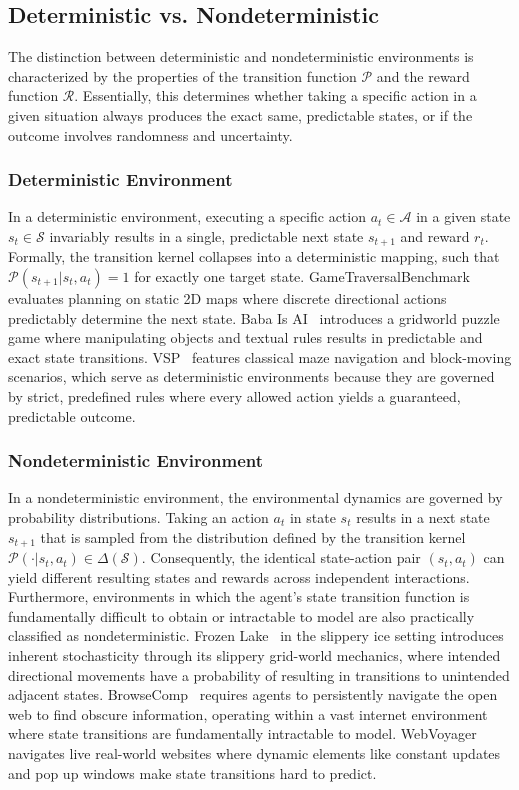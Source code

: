 \subsection{Deterministic vs. Nondeterministic}
\label{attribute:Deterministic vs. Nondeterministic}
The distinction between deterministic and nondeterministic environments is characterized by the properties of the transition function $\mathcal{P}$ and the reward function $\mathcal{R}$. Essentially, this determines whether taking a specific action in a given situation always produces the exact same, predictable states, or if the outcome involves randomness and uncertainty.

\subsubsection{Deterministic Environment}
In a deterministic environment, executing a specific action $a_t \in \mathcal{A}$ in a given state $s_t \in \mathcal{S}$ invariably results in a single, predictable next state $s_{t+1}$ and reward $r_t$. Formally, the transition kernel collapses into a deterministic mapping, such that $\mathcal{P}(s_{t+1} | s_t, a_t) = 1$ for exactly one target state. GameTraversalBenchmark~\cite{GameTraversalBenchmark} evaluates planning on static 2D maps where discrete directional actions predictably determine the next state. Baba Is AI~\cite{BabaIsAI} introduces a gridworld puzzle game where manipulating objects and textual rules results in predictable and exact state transitions. 
VSP~\cite{Vsp} features classical maze navigation and block-moving scenarios, which serve as deterministic environments because they are governed by strict, predefined rules where every allowed action yields a guaranteed, predictable outcome.


\subsubsection{Nondeterministic Environment}
In a nondeterministic environment, the environmental dynamics are governed by probability distributions. Taking an action $a_t$ in state $s_t$ results in a next state $s_{t+1}$ that is sampled from the distribution defined by the transition kernel $\mathcal{P}(\cdot | s_t, a_t) \in \Delta(\mathcal{S})$. Consequently, the identical state-action pair $(s_t, a_t)$ can yield different resulting states and rewards across independent interactions. Furthermore, environments in which the agent's state transition function is fundamentally difficult to obtain or intractable to model are also practically classified as nondeterministic. Frozen Lake~\cite{Openai_gym} in the slippery ice setting introduces inherent stochasticity through its slippery grid-world mechanics, where intended directional movements have a probability of resulting in transitions to unintended adjacent states. BrowseComp~\cite{BrowseComp} requires agents to persistently navigate the open web to find obscure information, operating within a vast internet environment where state transitions are fundamentally intractable to model. WebVoyager~\cite{WebVoyager} navigates live real-world websites where dynamic elements like constant updates and pop up windows make state transitions hard to predict.

